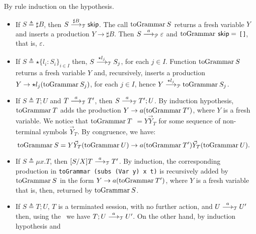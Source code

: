 \begin{itemizeproof}
By rule induction on the hypothesis.
\begin{itemize}
\item If $S\triangleq \sharp B$, then
  $S \LTSderives[\sharp B] \skipk$. The call $\toGrammarf S$
  returns a fresh variable $Y$ and inserts a production
  $Y\rightarrow \sharp B$. Then $S \LTSderivesP \varepsilon$ and
  $\toGrammarf\,\skipk =$ \lstinline{[]}, that is, $\varepsilon$.
\item If $S\triangleq \star\{l_i\colon S_i\}_{i\in I}$ then,
  $S \LTSderives[\star l_j] S_j$, for each $j\in I$. Function
  $\toGrammarf S$ returns a fresh variable $Y$ and, recursively,
  inserts a production $Y\rightarrow \star l_j (\toGrammarf{S_j})$,
  for each $j\in I$, hence
  $Y \LTSderivesP[\star l_j] \toGrammarf{S_j}$.
\item If $S\triangleq T;U$ and $T \LTSderives[a] T'$, then
  $S \LTSderives[a] T';U$.  By induction hypothesis, $\toGrammarf T$
  adds the production $Y\rightarrow a (\toGrammarf{T'})$, where $Y$
  is a fresh variable.  We notice that $\toGrammarf T$
  $= Y \vec Y_T$ for some sequence of non-terminal symbols
  $\vec Y_T$. By congruence, we have:
  \[\toGrammarf S = Y\vec Y_T(\toGrammarf U)
    \rightarrow a(\toGrammarf T')\vec Y_T(\toGrammarf U)
    .\]
\item If $S\triangleq \mu x.T$, then $\subs SXT \LTSderives T'$.
  By induction, the corresponding production in
  \lstinline{toGrammar (subs (Var y) x t)} is recursively added by
  $\toGrammarf S$ in the form $Y \rightarrow a (\toGrammarf{T'})$,
  where $Y$ is a fresh variable that is, then, returned by
  $\toGrammarf S$.
\item If $S\triangleq T;U$, $T$ is a terminated session, with no further
  action, and $U \LTSderives[a] U'$ then, using the \LTS\ we have
  $T;U \LTSderives[a] U'$. On the other hand, by induction hypothesis and

\end{itemize}
\end{itemizeproof}
